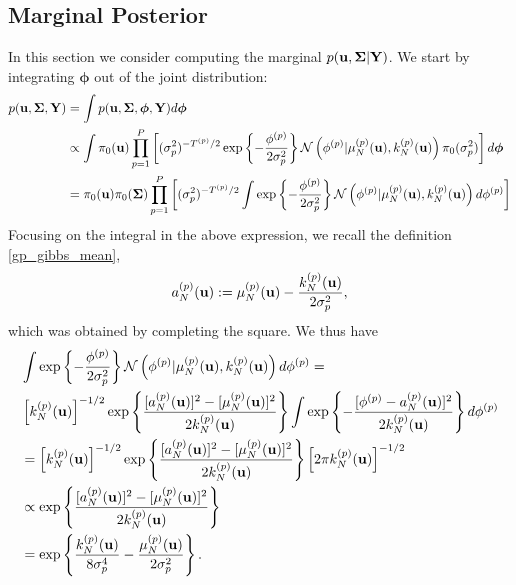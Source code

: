\documentclass[12pt]{article}
\newcommand{\bphi}{\boldsymbol{\phi}}
\begin{document}
\subsection{Marginal Posterior}
In this section we consider computing the marginal $p(\mathbf{u}, \boldsymbol{\Sigma}|\mathbf{Y})$. We start by integrating $\bphi$ out of the joint distribution: 
\begin{align*}
p(\bpar, \CovObs, \stateMat) 
&= \int p(\bpar, \CovObs, \bphi, \stateMat) d\bphi \\
&\propto \int \priorDens(\bpar) \prod_{\objIdx=1}^{\Nobj} \left[(\sdObs^2_{\objIdx})^{-\indexObj{\Ntime}/2} \exp\left\{-\frac{\indexObj{\phi} }{2\sdObs^2_{\objIdx}} \right\} 
\Gaussian\left(\indexObj{\phi}  | \GPMeanPredOut{\Ndesign}{\objIdx}(\bpar), \GPKerPredOut{\Ndesign}{\objIdx}(\bpar)\right) \priorDens(\sdObs^2_{\objIdx})\right] d\bphi \\
&= \priorDens(\bpar) \priorDens(\CovObs) \prod_{\objIdx=1}^{\Nobj} \left[(\sdObs^2_{\objIdx})^{-\indexObj{\Ntime}/2} \int \exp\left\{-\frac{\indexObj{\phi} }{2\sdObs^2_{\objIdx}} \right\} 
\Gaussian\left(\indexObj{\phi}  | \GPMeanPredOut{\Ndesign}{\objIdx}(\bpar), \GPKerPredOut{\Ndesign}{\objIdx}(\bpar)\right) d\indexObj{\phi}\right]
\end{align*}
Focusing on the integral in the above expression, we recall the definition \ref{gp_gibbs_mean},
\[
{a}^{(p)}_{N}(\mathbf{u}) := \mu_{N}^{(p)}(\mathbf{u}) - \frac{k_{N}^{(p)}(\mathbf{u})}{2\sigma^2_{p}},
\]
which was obtained by completing the square. We thus have 
\begin{align*}
&\int \exp\left\{-\frac{{\phi}^{(p)} }{2\sigma^2_{p}} \right\} 
\mathcal{N}\left({\phi}^{(p)}  | \mu_{N}^{(p)}(\mathbf{u}), k_{N}^{(p)}(\mathbf{u})\right) d{\phi}^{(p)} = \\
& \left[k_{N}^{(p)}(\mathbf{u})\right]^{-1/2} \exp\left\{\frac{[{a}^{(p)}_{N}(\mathbf{u})]^2- [\mu_{N}^{(p)}(\mathbf{u})]^2}{2k_{N}^{(p)}(\mathbf{u})} \right\} \int \exp\left\{-\frac{[{\phi}^{(p)} - {a}^{(p)}_{N}(\mathbf{u})]^2}{2k_{N}^{(p)}(\mathbf{u})} \right\} d{\phi}^{(p)} \\
&= \left[k_{N}^{(p)}(\mathbf{u})\right]^{-1/2} \exp\left\{\frac{[{a}^{(p)}_{N}(\mathbf{u})]^2- [\mu_{N}^{(p)}(\mathbf{u})]^2}{2k_{N}^{(p)}(\mathbf{u})} \right\} \left[2\pi k_{N}^{(p)}(\mathbf{u})\right]^{-1/2} \\
&\propto  \exp\left\{\frac{[{a}^{(p)}_{N}(\mathbf{u})]^2- [\mu_{N}^{(p)}(\mathbf{u})]^2}{2k_{N}^{(p)}(\mathbf{u})} \right\} \\
&= \exp\left\{\frac{k_{N}^{(p)}(\mathbf{u})}{8\sigma^4_{p}} - \frac{\mu_{N}^{(p)}(\mathbf{u})}{2\sigma^2_{p}} \right\}.
\end{align*}
\end{document}
